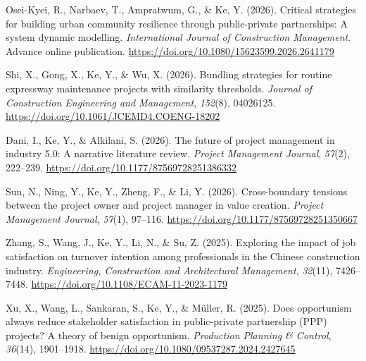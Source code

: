 \documentclass[11pt,a4paper]{report} %
\begin{document}
\begin{tablist}
        \item[2026] \tab{}Osei-Kyei, R., Narbaev, T., Ampratwum, G., \& Ke, Y. (2026). Critical strategies for building urban community resilience through public-private partnerships: A system dynamic modelling. \textit{International Journal of Construction Management}. Advance online publication. \href{https://doi.org/10.1080/15623599.2026.2641179}{https://doi.org/10.1080/15623599.2026.2641179}

        \item[2026] \tab{}Shi, X., Gong, X., Ke, Y., \& Wu, X. (2026). Bundling strategies for routine expressway maintenance projects with similarity thresholds. \textit{Journal of Construction Engineering and Management}, \textit{152}(8), 04026125. \href{https://doi.org/10.1061/JCEMD4.COENG-18202}{https://doi.org/10.1061/JCEMD4.COENG-18202} 

        \item[2026] \tab{}Dani, I., Ke, Y., \& Alkilani, S. (2026). The future of project management in industry 5.0: A narrative literature review. \textit{Project Management Journal}, \textit{57}(2), 222--239. \href{https://doi.org/10.1177/87569728251386332}{https://doi.org/10.1177/87569728251386332}

        \item[2026] \tab{}Sun, N., Ning, Y., Ke, Y., Zheng, F., \& Li, Y. (2026). Cross-boundary tensions between the project owner and project manager in value creation. \textit{Project Management Journal}, \textit{57}(1), 97--116. \href{https://doi.org/10.1177/87569728251350667}{https://doi.org/10.1177/87569728251350667}
        
        \item[2025] \tab{}Zhang, S., Wang, J., Ke, Y., Li, N., \& Su, Z. (2025). Exploring the impact of job satisfaction on turnover intention among professionals in the Chinese construction industry. \textit{Engineering, Construction and Architectural Management}, \textit{32}(11), 7426--7448. \href{https://doi.org/10.1108/ECAM-11-2023-1179}{https://doi.org/10.1108/ECAM-11-2023-1179}

        \item[2025] \tab{}Xu, X., Wang, L., Sankaran, S., Ke, Y., \& Müller, R. (2025). Does opportunism always reduce stakeholder satisfaction in public-private partnership (PPP) projects? A theory of benign opportunism. \textit{Production Planning \& Control}, \textit{36}(14), 1901--1918. \href{https://doi.org/10.1080/09537287.2024.2427645}{https://doi.org/10.1080/09537287.2024.2427645}


\end{tablist}
\end{document}
